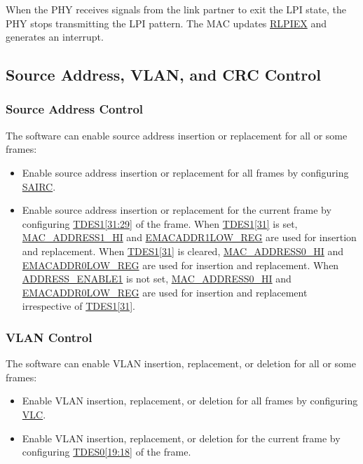 \documentclass[main\_\_EN.tex]{subfiles}
\begin{document}
When the PHY receives signals from the link partner to exit the LPI state, the PHY stops transmitting the LPI pattern. The MAC updates \hyperref[regdesc:EMACLPICSRREG]{RLPIEX} and generates an interrupt.

\subsection{Source Address, VLAN, and CRC Control}

\subsubsection{Source Address Control}

The software can enable source address insertion or replacement for all or some frames:
\begin{itemize}
    \item Enable source address insertion or replacement for all frames by configuring \hyperref[regdesc:EMACCONFIGREG]{SAIRC}.
    \item Enable source address insertion or replacement for the current frame by configuring \hyperref[tab:ethernetmac-TDES1]{TDES1[31:29]} of the frame. When \hyperref[tab:ethernetmac-TDES1]{TDES1[31]} is set, \hyperref[regdesc:EMACADDR1HIGHREG]{MAC\_ADDRESS1\_HI} and \hyperref[regdesc:EMACADDR1LOWREG]{EMACADDR1LOW\_REG} are used for insertion and replacement. When \hyperref[tab:ethernetmac-TDES1]{TDES1[31]} is cleared, \hyperref[regdesc:EMACADDR0HIGHREG]{MAC\_ADDRESS0\_HI} and \hyperref[regdesc:EMACADDR0LOWREG]{EMACADDR0LOW\_REG} are used for insertion and replacement. When \hyperref[regdesc:EMACADDR1HIGHREG]{ADDRESS\_ENABLE1} is not set, \hyperref[regdesc:EMACADDR0HIGHREG]{MAC\_ADDRESS0\_HI} and  \hyperref[regdesc:EMACADDR0LOWREG]{EMACADDR0LOW\_REG} are used for insertion and replacement irrespective of \hyperref[tab:ethernetmac-TDES1]{TDES1[31]}.
\end{itemize}

\subsubsection{VLAN Control}

The software can enable VLAN insertion,  replacement, or deletion for all or some frames:

\begin{itemize}
    \item Enable VLAN insertion,  replacement, or deletion for all frames by configuring \hyperref[regdesc:EMACTXVLANTAGCONTROLREG]{VLC}.
    \item Enable VLAN insertion, replacement, or deletion for the current frame by configuring \hyperref[tab:ethernetmac-TDES0]{TDES0[19:18]} of the frame.
\end{itemize}
\end{document}
